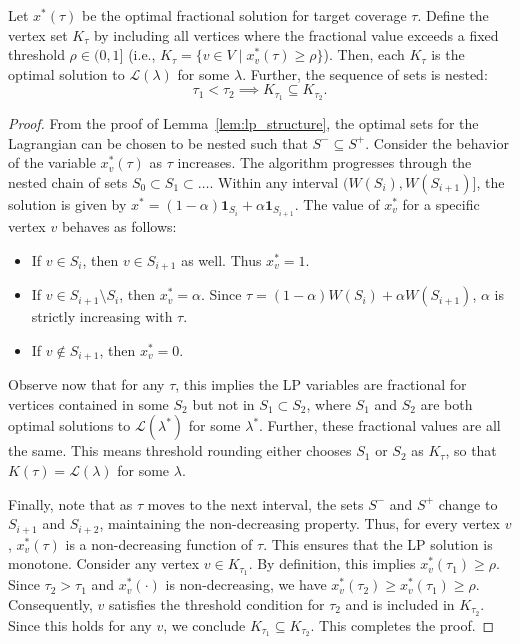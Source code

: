 \begin{lemma}
\label{lem:rounding_monotone}
Let $x^*(\tau)$ be the optimal fractional solution for target coverage $\tau$. Define the  vertex set $K_\tau$ by including all vertices where the fractional value exceeds a fixed threshold $\rho \in (0, 1]$ (i.e., $K_\tau = \{ v \in V \mid x^*_v(\tau) \ge \rho \}$). Then, each $K_{\tau}$ is the optimal solution to $\mathcal{L}(\lambda)$ for some $\lambda$.
Further, the sequence of sets is nested:
\[ \tau_1 < \tau_2 \implies K_{\tau_1} \subseteq K_{\tau_2}. \] 
\end{lemma}
\begin{proof}
From the proof of Lemma~\ref{lem:lp_structure}, the optimal sets for the Lagrangian can be chosen to be nested such that $S^- \subseteq S^+$. Consider the behavior of the variable $x^*_v(\tau)$ as $\tau$ increases. The algorithm progresses through the nested chain of sets $S_0 \subset S_1 \subset \dots$. Within any interval $(W(S_i), W(S_{i+1})]$, the solution is given by $x^* = (1-\alpha)\mathbf{1}_{S_i} + \alpha\mathbf{1}_{S_{i+1}}$. The value of $x^*_v$ for a specific vertex $v$ behaves as follows:
\begin{itemize}
    \item If $v \in S_i$, then $v \in S_{i+1}$ as well. Thus $x^*_v = 1$.
    \item If $v \in S_{i+1} \setminus S_i$, then $x^*_v = \alpha$. Since $\tau = (1-\alpha)W(S_i) + \alpha W(S_{i+1})$, $\alpha$ is strictly increasing with $\tau$.
    \item If $v \notin S_{i+1}$, then $x^*_v = 0$.
\end{itemize}

Observe now that for any $\tau$, this implies the LP variables are fractional for vertices contained in some $S_2$ but not in $S_1 \subset S_2$, where $S_1$ and $S_2$ are both optimal solutions to $\mathcal{L}(\lambda^*)$ for some $\lambda^*$. Further, these fractional values are all the same. This means threshold rounding either chooses $S_1$ or $S_2$ as $K_{\tau}$, so that $K(\tau) = \mathcal L(\lambda)$ for some $\lambda$. 

Finally, note that as $\tau$ moves to the next interval, the sets $S^-$ and $S^+$ change to $S_{i+1}$ and $S_{i+2}$, maintaining the non-decreasing property. Thus, for every vertex $v$, $x^*_v(\tau)$ is a non-decreasing function of $\tau$. This ensures that the LP solution is monotone. Consider any vertex $v \in K_{\tau_1}$. By definition, this implies $x^*_v(\tau_1) \ge \rho$. Since $\tau_2 > \tau_1$ and $x^*_v(\cdot)$ is non-decreasing, we have $x^*_v(\tau_2) \ge x^*_v(\tau_1) \ge \rho.$ Consequently, $v$ satisfies the threshold condition for $\tau_2$ and is included in $K_{\tau_2}$. Since this holds for any $v$, we conclude $K_{\tau_1} \subseteq K_{\tau_2}$. This completes the proof.
\end{proof}

